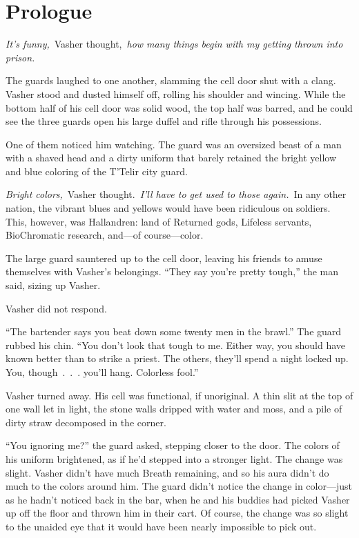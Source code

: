 \section{Prologue}



\textit{It’s funny,}~Vasher thought,~\textit{how many things begin with my getting thrown into prison.}

The guards laughed to one another, slamming the cell door shut with a clang. Vasher stood and dusted himself off, rolling his shoulder and wincing. While the bottom half of his cell door was solid wood, the top half was barred, and he could see the three guards open his large duffel and rifle through his possessions.

One of them noticed him watching. The guard was an oversized beast of a man with a shaved head and a dirty uniform that barely retained the bright yellow and blue coloring of the T’Telir city guard.

\textit{Bright colors,}~Vasher thought.~\textit{I’ll have to get used to those again.}~In any other nation, the vibrant blues and yellows would have been ridiculous on soldiers. This, however, was Hallandren: land of Returned gods, Lifeless servants, BioChromatic research, and—of course—color.

The large guard sauntered up to the cell door, leaving his friends to amuse themselves with Vasher’s belongings. “They say you’re pretty tough,” the man said, sizing up Vasher.

Vasher did not respond.

“The bartender says you beat down some twenty men in the brawl.” The guard rubbed his chin. “You don’t look that tough to me. Either way, you should have known better than to strike a priest. The others, they’ll spend a night locked up. You, though~.~.~. you’ll hang. Colorless fool.”

Vasher turned away. His cell was functional, if unoriginal. A thin slit at the top of one wall let in light, the stone walls dripped with water and moss, and a pile of dirty straw decomposed in the corner.

“You ignoring me?” the guard asked, stepping closer to the door. The colors of his uniform brightened, as if he’d stepped into a stronger light. The change was slight. Vasher didn’t have much Breath remaining, and so his aura didn’t do much to the colors around him. The guard didn’t notice the change in color—just as he hadn’t noticed back in the bar, when he and his buddies had picked Vasher up off the floor and thrown him in their cart. Of course, the change was so slight to the unaided eye that it would have been nearly impossible to pick out.


